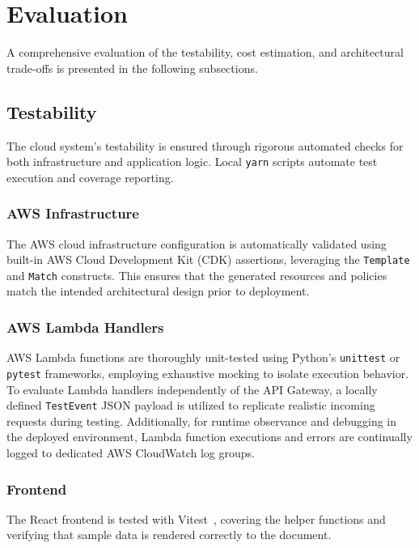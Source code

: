 \section{Evaluation}\label{sec:evaluation}

A comprehensive evaluation of the testability, cost estimation, and architectural trade-offs
is presented in the following subsections.

\subsection{Testability}\label{sec:testability}
The cloud system's testability is ensured through rigorous automated checks for
both infrastructure and application logic. Local \texttt{yarn} scripts automate
test execution and coverage reporting.

\subsubsection{AWS Infrastructure}
The AWS cloud infrastructure configuration is automatically validated using
built-in AWS Cloud Development Kit (CDK) assertions, leveraging the
\texttt{Template} and \texttt{Match} constructs. This ensures that the generated
resources and policies match the intended architectural design prior to deployment.

\subsubsection{AWS Lambda Handlers}
AWS Lambda functions are thoroughly unit-tested using Python's \texttt{unittest}
or \texttt{pytest} frameworks, employing exhaustive mocking to isolate execution
behavior. To evaluate Lambda handlers independently of the API Gateway, a locally
defined \texttt{TestEvent} JSON payload is utilized to replicate realistic
incoming requests during testing. Additionally, for runtime observance and
debugging in the deployed environment, Lambda function executions and errors
are continually logged to dedicated AWS CloudWatch log groups.

\subsubsection{Frontend}
The React frontend is tested with Vitest~\cite{vitest}, covering the helper functions
and verifying that sample data is rendered correctly to the document.

